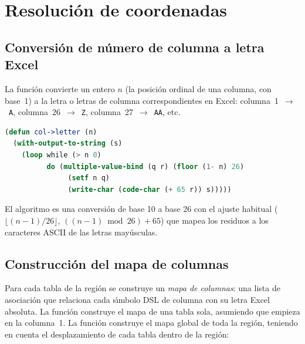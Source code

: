 \section{Resoluci\'on de coordenadas}
\label{sec:resolucion-coordenadas}

\subsection{Conversi\'on de n\'umero de columna a letra Excel}
\label{ssec:col-letter}

La funci\'on  convierte un entero $n$ (la posici\'on
ordinal de una columna, con base~1) a la letra o letras de columna
correspondientes en Excel: columna~1~$\to$~\texttt{A}, columna~26~$\to$~\texttt{Z},
columna~27~$\to$~\texttt{AA}, etc.

\begin{lstlisting}[language=CommonLisp,
  caption={Funci\'on col-\textgreater{}letter.}]
(defun col->letter (n)
  (with-output-to-string (s)
    (loop while (> n 0)
          do (multiple-value-bind (q r) (floor (1- n) 26)
               (setf n q)
               (write-char (code-char (+ 65 r)) s)))))
\end{lstlisting}

El algoritmo es una conversi\'on de base 10 a base 26 con el ajuste
habitual ($\lfloor (n-1)/26 \rfloor$, $((n-1) \bmod 26) + 65$) que mapea
los residuos a los caracteres ASCII de las letras may\'usculas.

\subsection{Construcci\'on del mapa de columnas}
\label{ssec:col-map}

Para cada tabla de la regi\'on se construye un \emph{mapa de columnas}:
una lista de asociaci\'on que relaciona cada s\'{\i}mbolo DSL de columna con
su letra Excel absoluta.  La funci\'on  construye el mapa
de una tabla sola, asumiendo que empieza en la columna~1.  La funci\'on
 construye el mapa global de toda la regi\'on,
teniendo en cuenta el desplazamiento de cada tabla dentro de la regi\'on:

